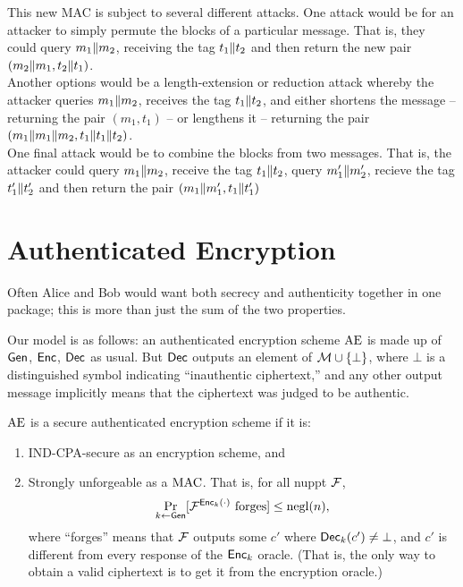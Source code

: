 \documentclass[11pt]{article}
\begin{document}
\begin{answer}
  This new MAC is subject to several different attacks. One attack
  would be for an attacker to simply permute the blocks of a
  particular message. That is, they could query \(m_1 \| m_2\),
  receiving the tag \(t_1 \| t_2\) and then return the
  new pair \((m_2 \| m_1, t_2 \| t_1)\). \\

  \noindent Another options would be a length-extension or reduction
  attack whereby the attacker queries \(m_1 \| m_2\), receives
  the tag \(t_1 \| t_2\), and either shortens the message --
  returning the pair \((m_1, t_1)\) -- or lengthens it -- returning
  the pair \((m_1 \| m_1 \| m_2, t_1
  \| t_1 \| t_2)\). \\

  \noindent One final attack would be to combine the blocks from two
  messages. That is, the attacker could query \(m_1 \| m_2\),
  receive the tag \(t_1 \| t_2\), query \(m_1' \| m_2'\),
  recieve the tag \(t_1' \| t_2'\) and then return the pair
  \((m_1 \| m_1', t_1 \| t_1')\)
\end{answer}


\section{Authenticated Encryption}
\label{sec:auth-encrypt}

Often Alice and Bob would want both secrecy and authenticity together
in one package; this is more than just the sum of the two properties.

Our model is as follows: an authenticated encryption scheme
$\text{AE}$ is made up of $\mathsf{Gen}$, $\mathsf{Enc}$, $\mathsf{Dec}$ as usual.
But $\mathsf{Dec}$ outputs an element of $\mathcal{M} \cup \{\bot\}$, where
$\bot$ is a distinguished symbol indicating ``inauthentic
ciphertext,'' and any other output message implicitly means that the
ciphertext was judged to be authentic.

\begin{definition}
  $\text{AE}$ is a secure authenticated encryption scheme if it is:
  \begin{enumerate}
  \item IND-CPA-secure as an encryption scheme, and
  \item Strongly unforgeable as a $\text{MAC}$.  That is, for all nuppt
    $\mathcal{F}$,
    \[
    \Pr_{k \gets \mathsf{Gen}}[\mathcal{F}^{\mathsf{Enc}_k(\cdot)} \text{ forges}] \leq \operatorname{negl}(n),
    \]
    where ``forges'' means that $\mathcal{F}$ outputs some $c'$ where
    $\mathsf{Dec}_k(c') \neq \bot$, and $c'$ is different from every
    response of the $\mathsf{Enc}_{k}$ oracle.  (That is, the only way to
    obtain a valid ciphertext is to get it from the encryption
    oracle.)
  \end{enumerate}
\end{definition}
\end{document}
